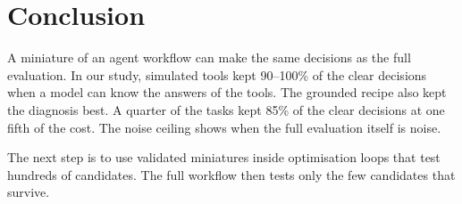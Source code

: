 \section{Conclusion}
\label{sec:conclusion}

A miniature of an agent workflow can make the same decisions as the full evaluation. In our study,
simulated tools kept 90--100\% of the clear decisions when a model can know the answers of the
tools. The grounded recipe also kept the diagnosis best. A quarter of the tasks kept 85\% of the
clear decisions at one fifth of the cost. The noise ceiling shows when the full evaluation itself
is noise.

The next step is to use validated miniatures inside optimisation loops that test hundreds of
candidates. The full workflow then tests only the few candidates that survive.
